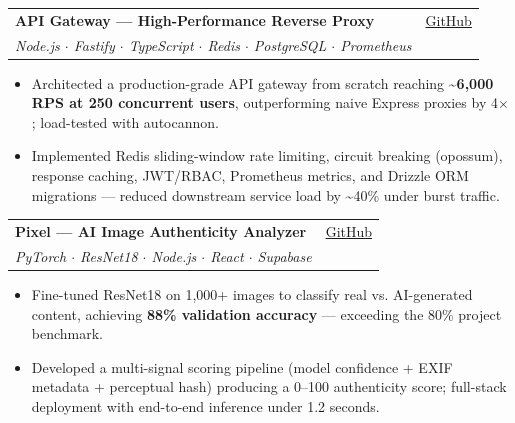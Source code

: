 \documentclass[a4paper,10pt]{article}
\newcommand{\fontsizemeta}{\fontsize{8.2}{12}\selectfont}
\newcommand{\fontsizetitle}{\fontsize{10}{13}\selectfont}
\newcommand{\fontsizebody}{\fontsize{9}{14}\selectfont}
\begin{document}
\vspace{5pt}
\begin{tabularx}{\textwidth}{@{}X r@{}}
    {\fontsizetitle\textbf{API Gateway — High-Performance Reverse Proxy}} & {\fontsizemeta\href{https://github.com/vednarvekar/api-gateway}{GitHub}} \\
    {\fontsizemeta\color{gray}\textit{Node.js $\cdot$ Fastify $\cdot$ TypeScript $\cdot$ Redis $\cdot$ PostgreSQL $\cdot$ Prometheus}} &
\end{tabularx}
\vspace{2pt}
\begin{itemize}[leftmargin=12pt, labelsep=6pt, itemsep=1.5pt, topsep=0pt, parsep=0pt]
    \item[\raisebox{0.25ex}{\tiny$\bullet$}] {\fontsizebody Architected a production-grade API gateway from scratch reaching \textbf{\textasciitilde{}6,000 RPS at 250 concurrent users}, outperforming naive Express proxies by 4$\times$; load-tested with autocannon.}
    \item[\raisebox{0.25ex}{\tiny$\bullet$}] {\fontsizebody Implemented Redis sliding-window rate limiting, circuit breaking (opossum), response caching, JWT/RBAC, Prometheus metrics, and Drizzle ORM migrations — reduced downstream service load by \textasciitilde{}40\% under burst traffic.}
\end{itemize}

\vspace{5pt}
\begin{tabularx}{\textwidth}{@{}X r@{}}
    {\fontsizetitle\textbf{Pixel — AI Image Authenticity Analyzer}} & {\fontsizemeta\href{https://github.com/vednarvekar/Pixel}{GitHub}} \\
    {\fontsizemeta\color{gray}\textit{PyTorch $\cdot$ ResNet18 $\cdot$ Node.js $\cdot$ React $\cdot$ Supabase}} &
\end{tabularx}
\vspace{2pt}
\begin{itemize}[leftmargin=12pt, labelsep=6pt, itemsep=1.5pt, topsep=0pt, parsep=0pt]
    \item[\raisebox{0.25ex}{\tiny$\bullet$}] {\fontsizebody Fine-tuned ResNet18 on 1,000+ images to classify real vs. AI-generated content, achieving \textbf{88\% validation accuracy} — exceeding the 80\% project benchmark.}
    \item[\raisebox{0.25ex}{\tiny$\bullet$}] {\fontsizebody Developed a multi-signal scoring pipeline (model confidence + EXIF metadata + perceptual hash) producing a 0--100 authenticity score; full-stack deployment with end-to-end inference under 1.2 seconds.}
\end{itemize}
\end{document}
